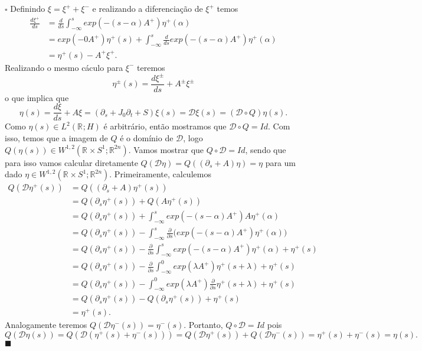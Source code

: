 \documentclass[12pt]{book}
\newenvironment{prova}[1]{$\square$ #1}{\hfill$\blacksquare$}
\newcommand{\circulo}{S^{1}}
\newcommand{\diferencialmapafloerabrev}{\mathcal{D}}
\newcommand{\derivada}[2]{\frac{d #1}{d #2}}
\newcommand{\derivadaparcial}[2]{\frac{\partial #1}{\partial #2}}
\newcommand{\derivadaparcialabrev}[1]{\partial_{#1}}
\newcommand{\espacoLdois}[1]{L^{2}(#1)}
\newcommand{\espacosobolevgeral}[2]{W^{1,#1}(#2)}
\newcommand{\estruturacomplexa}{J_{0}}
\newcommand{\retacartesianocirculo}{\real{} \times \circulo}
\newcommand{\real}[1]{\mathbb{R}^{#1}}
\newcommand{\reta}{\real{}}
\begin{document}
\begin{prova}
		Definindo $\xi = \xi^{+} + \xi^{-}$ e realizando a diferenciação de $\xi^{+}$ temos
		$$
		\begin{aligned}
		\derivada{\xi^{+}}{s} 
		&= \derivada{}{s}\int_{-\infty}^{s}exp(-(s-\alpha)A^{+})\eta^{+}(\alpha)
		\\
		&= exp(-0A^{+})\eta^{+}(s)+\int_{-\infty}^{s} \derivada{}{s} exp(-(s-\alpha)A^{+})\eta^{+}(\alpha) 
		\\
		&= \eta^{+}(s)-A^{+}\xi^{+}.
		\end{aligned}
		$$
		Realizando o mesmo cáculo para $\xi^{-}$ teremos 
		$$
		\eta^{\pm}(s) =\derivada{\xi^{\pm}}{s}+A^{\pm}\xi^{\pm}
		$$
		o que implica que
		$$
		\eta(s) =\derivada{\xi}{s}+A\xi = (\derivadaparcialabrev{s}+\estruturacomplexa \derivadaparcialabrev{t} + S)\xi(s) = \diferencialmapafloerabrev \xi(s) = (\diferencialmapafloerabrev \circ Q)\eta(s).
		$$
		Como $\eta(s) \in \espacoLdois{\reta; H}$ é arbitrário, então mostramos que $\diferencialmapafloerabrev \circ Q = Id$. Com isso, temos que a imagem de $Q$ é o domínio de $\diferencialmapafloerabrev$, logo $Q(\eta(s)) \in \espacosobolevgeral{2}{\retacartesianocirculo;\real{2n}}$. Vamos mostrar que $Q\circ \diferencialmapafloerabrev = Id$, sendo que para isso vamos calcular diretamente $Q(\diferencialmapafloerabrev\eta)=Q((\derivadaparcialabrev{s}+A)\eta) = \eta$ para um dado $\eta \in \espacosobolevgeral{2}{\retacartesianocirculo;\real{2n}}$. Primeiramente, calculemos 
		$$
		\begin{aligned}
		Q(\diferencialmapafloerabrev \eta^{+}(s))
		&=Q((\derivadaparcialabrev{s}+A)\eta^{+}(s))
		\\
		&=Q(\derivadaparcialabrev{s}\eta^{+}(s)) +Q(A\eta^{+}(s))
		\\
		&=Q(\derivadaparcialabrev{s}\eta^{+}(s))  + \int_{-\infty}^{s}exp(-(s-\alpha)A^{+})A\eta^{+}(\alpha)
		\\
		&=Q(\derivadaparcialabrev{s}\eta^{+}(s))  - \int_{-\infty}^{s}\derivadaparcial{}{s}\Big(exp(-(s-\alpha)A^{+})\eta^{+}(\alpha)\Big)
		\\
		&=Q(\derivadaparcialabrev{s}\eta^{+}(s)) - \derivadaparcial{}{s}\int_{-\infty}^{s} exp(-(s-\alpha)A^{+})\eta^{+}(\alpha) + \eta^{+}(s)
		\\
		&=Q(\derivadaparcialabrev{s}\eta^{+}(s)) - \derivadaparcial{}{s}\int_{-\infty}^{0} exp(\lambda A^{+})\eta^{+}(s+\lambda) + \eta^{+}(s)
		\\
		&=Q(\derivadaparcialabrev{s}\eta^{+}(s)) - \int_{-\infty}^{0} exp(\lambda A^{+})\derivadaparcial{}{s}\eta^{+}(s+\lambda) + \eta^{+}(s)
		\\
		&=Q(\derivadaparcialabrev{s}\eta^{+}(s)) - Q(\derivadaparcialabrev{s}\eta^{+}(s)) + \eta^{+}(s)
		\\
		&=\eta^{+}(s).
		\end{aligned}
		$$
		Analogamente teremos $Q(\diferencialmapafloerabrev \eta^{-}(s)) =\eta^{-}(s)$. Portanto, $Q\circ \diferencialmapafloerabrev = Id$ pois
		$$
		Q(\diferencialmapafloerabrev \eta(s)) = Q(\diferencialmapafloerabrev (\eta^{+}(s)+\eta^{-}(s)))=Q(\diferencialmapafloerabrev \eta^{+}(s))+Q(\diferencialmapafloerabrev \eta^{-}(s)) = \eta^{+}(s)+\eta^{-}(s) = \eta(s).
		$$
	\end{prova}
	
\end{document}
